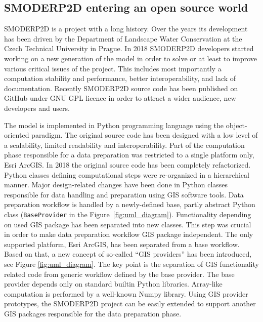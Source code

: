 \subsection{SMODERP2D entering an open source world}\label{ref:open_source_providers}

SMODERP2D is a project with a long history. Over the years its
development has been driven by the Department of Landscape Water
Conservation at the Czech Technical University in Prague. In 2018
SMODERP2D developers started working on a new generation of the model
in order to solve or at least to improve various critical issues of
the project. This includes most importantly a computation stability
and performance, better interoperability, and lack of
documentation. Recently SMODERP2D source code has been published on
GitHub \cite{smoderp2d-github-2019} under GNU GPL licence in order to
attract a wider audience, new developers and users.

The model is implemented in Python programming language using the
object-oriented paradigm. The original source code has been designed
with a low level of a scalability, limited readability and
interoperability. Part of the computation phase responsible for a data
preparation was restricted to a single platform only, Esri ArcGIS. In
2018 the original source code has been completely refactorized. Python
classes defining computational steps were re-organized in a
hierarchical manner. Major design-related changes have been done in
Python classes responsible for data handling and preparation using GIS
software tools. Data preparation workflow is handled by a
newly-defined base, partly abstract Python class ({\tt BaseProvider}
in the Figure~\ref{fig:uml_diagram}). Functionality depending on used
GIS package has been separated into new classes. This step was crucial
in order to make data preparation workflow GIS package
independent. The only supported platform, Esri ArcGIS, has been
separated from a base workflow. Based on that, a new concept of
so-called “GIS providers” has been introduced, see
Figure \ref{fig:uml_diagram}. The key point is the separation of GIS
functionality related code from generic workflow defined by the base
provider. The base provider depends only on standard builtin Python
libraries. Array-like computation is performed by a well-known Numpy
library. Using GIS provider prototypes, the SMODERP2D project can be
easily extended to support another GIS packages responsible for the
data preparation phase.

